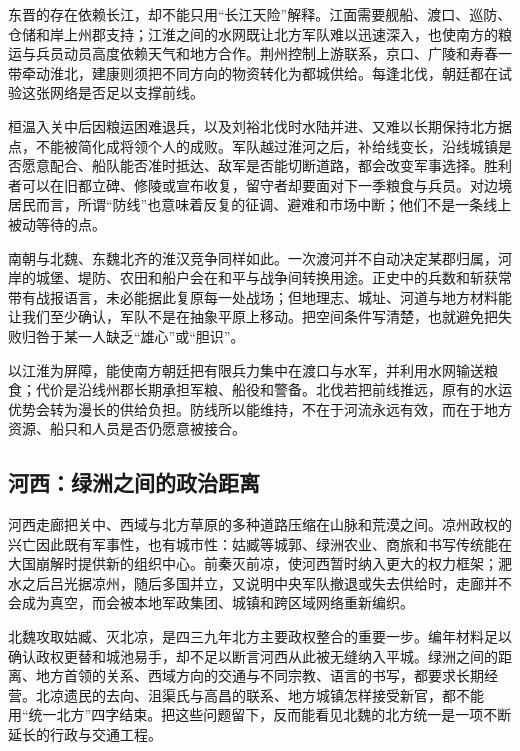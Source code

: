 东晋的存在依赖长江，却不能只用“长江天险”解释。江面需要舰船、渡口、巡防、仓储和岸上州郡支持；江淮之间的水网既让北方军队难以迅速深入，也使南方的粮运与兵员动员高度依赖天气和地方合作。荆州控制上游联系，京口、广陵和寿春一带牵动淮北，建康则须把不同方向的物资转化为都城供给。每逢北伐，朝廷都在试验这张网络是否足以支撑前线。

桓温入关中后因粮运困难退兵，以及刘裕北伐时水陆并进、又难以长期保持北方据点，不能被简化成将领个人的成败。军队越过淮河之后，补给线变长，沿线城镇是否愿意配合、船队能否准时抵达、敌军是否能切断道路，都会改变军事选择。胜利者可以在旧都立碑、修陵或宣布收复，留守者却要面对下一季粮食与兵员。对边境居民而言，所谓“防线”也意味着反复的征调、避难和市场中断；他们不是一条线上被动等待的点。

南朝与北魏、东魏北齐的淮汉竞争同样如此。一次渡河并不自动决定某郡归属，河岸的城堡、堤防、农田和船户会在和平与战争间转换用途。正史中的兵数和斩获常带有战报语言，未必能据此复原每一处战场；但地理志、城址、河道与地方材料能让我们至少确认，军队不是在抽象平原上移动。把空间条件写清楚，也就避免把失败归咎于某一人缺乏“雄心”或“胆识”。

\begin{causalchain}[江淮防线的制度得失]
以江淮为屏障，能使南方朝廷把有限兵力集中在渡口与水军，并利用水网输送粮食；代价是沿线州郡长期承担军粮、船役和警备。北伐若把前线推远，原有的水运优势会转为漫长的供给负担。防线所以能维持，不在于河流永远有效，而在于地方资源、船只和人员是否仍愿意被接合。
\end{causalchain}

\subsection{河西：绿洲之间的政治距离}

河西走廊把关中、西域与北方草原的多种道路压缩在山脉和荒漠之间。凉州政权的兴亡因此既有军事性，也有城市性：姑臧等城郭、绿洲农业、商旅和书写传统能在大国崩解时提供新的组织中心。前秦灭前凉，使河西暂时纳入更大的权力框架；淝水之后吕光据凉州，随后多国并立，又说明中央军队撤退或失去供给时，走廊并不会成为真空，而会被本地军政集团、城镇和跨区域网络重新编织。

北魏攻取姑臧、灭北凉，是四三九年北方主要政权整合的重要一步。编年材料足以确认政权更替和城池易手，却不足以断言河西从此被无缝纳入平城。绿洲之间的距离、地方首领的关系、西域方向的交通与不同宗教、语言的书写，都要求长期经营。北凉遗民的去向、沮渠氏与高昌的联系、地方城镇怎样接受新官，都不能用“统一北方”四字结束。把这些问题留下，反而能看见北魏的北方统一是一项不断延长的行政与交通工程。

